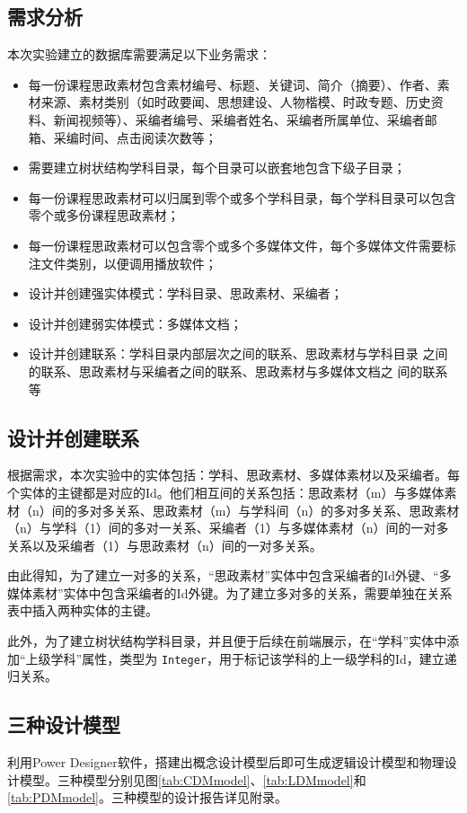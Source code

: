 \documentclass[11pt]{article}
\begin{document}
  \subsection{需求分析}

  本次实验建立的数据库需要满足以下业务需求：
  \begin{itemize}
    \item 每一份课程思政素材包含素材编号、标题、关键词、简介（摘要）、作者、素材来源、素材类别（如时政要闻、思想建设、人物楷模、时政专题、历史资料、新闻视频等）、采编者编号、采编者姓名、采编者所属单位、采编者邮箱、采编时间、点击阅读次数等；
    \item 需要建立树状结构学科目录，每个目录可以嵌套地包含下级子目录；
    \item 每一份课程思政素材可以归属到零个或多个学科目录，每个学科目录可以包含零个或多份课程思政素材；
    \item 每一份课程思政素材可以包含零个或多个多媒体文件，每个多媒体文件需要标注文件类别，以便调用播放软件；
    \item 设计并创建强实体模式：学科目录、思政素材、采编者；
    \item 设计并创建弱实体模式：多媒体文档；
    \item 设计并创建联系：学科目录内部层次之间的联系、思政素材与学科目录
    之间的联系、思政素材与采编者之间的联系、思政素材与多媒体文档之
    间的联系等

  \end{itemize}

  \subsection{设计并创建联系}

  根据需求，本次实验中的实体包括：学科、思政素材、多媒体素材以及采编者。每个实体的主键都是对应的Id。他们相互间的关系包括：思政素材（m）与多媒体素材（n）间的多对多关系、思政素材（m）与学科间（n）的多对多关系、思政素材（n）与学科（1）间的多对一关系、采编者（1）与多媒体素材（n）间的一对多关系以及采编者（1）与思政素材（n）间的一对多关系。

  由此得知，为了建立一对多的关系，“思政素材”实体中包含采编者的Id外键、“多媒体素材”实体中包含采编者的Id外键。为了建立多对多的关系，需要单独在关系表中插入两种实体的主键。

  此外，为了建立树状结构学科目录，并且便于后续在前端展示，在“学科”实体中添加“上级学科”属性，类型为 \verb|Integer|，用于标记该学科的上一级学科的Id，建立递归关系。

  \subsection{三种设计模型}
  利用Power Designer软件，搭建出概念设计模型后即可生成逻辑设计模型和物理设计模型。三种模型分别见图\ref{tab:CDMmodel}、\ref{tab:LDMmodel}和\ref{tab:PDMmodel}。三种模型的设计报告详见附录。
\end{document}
